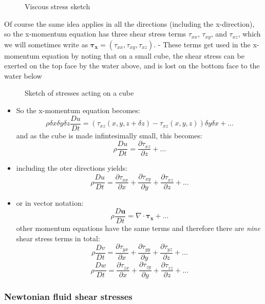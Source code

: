 \begin{figure}
\centering
\pandocbounded{}
\caption{Viscous stress sketch}
\end{figure}

Of course the same idea applies in all the directions (including the
x-direction), so the x-momentum equation has three shear stress terms
\(\tau_{xx}\), \(\tau_{xy}\), and \(\tau_{xz}\), which we will sometimes
write as \(\mathbf{\tau_x} = (\tau_{xx}, \tau_{xy}, \tau_{xz})\). -
These terms get used in the x-momentum equation by noting that on a
small cube, the shear stress can be exerted on the top face by the water
above, and is lost on the bottom face to the water below

\begin{figure}
\centering
\pandocbounded{}
\caption{Sketch of stresses acting on a cube}
\end{figure}

\begin{itemize}
\tightlist
\item
  So the x-momentum equation becomes:
  \[\rho \delta x \delta y \delta z \frac{D u}{Dt} = \left(\tau_{xz}(x,y,z+\delta z) - \tau_{xz}(x,y,z)\right) \delta y \delta x + ...\]
  and as the cube is made infintesimally small, this becomes:
  \[\rho \frac{D u}{Dt} = \frac{\partial \tau_{xz}}{\partial z} + ...\]
\item
  including the oter directions yields:
  \[\rho \frac{D u}{Dt} = \frac{\partial \tau_{xx}}{\partial x} + \frac{\partial \tau_{xy}}{\partial y} + \frac{\partial \tau_{xz}}{\partial z} +  ...\]
\item
  or in vector notation:
  \[\rho \frac{D \mathbf{u}}{Dt} = \nabla \cdot \mathbf{\tau_x} + ...\]
  other momentum equations have the same terms and therefore there are
  \emph{nine} shear stress terms in total:
  \[\rho \frac{D v}{Dt} = \frac{\partial \tau_{yx}}{\partial x} + \frac{\partial \tau_{yy}}{\partial y} + \frac{\partial \tau_{yz}}{\partial z} + ...\]
  \[\rho \frac{D w}{Dt} = \frac{\partial \tau_{zx}}{\partial x} + \frac{\partial \tau_{zy}}{\partial y} + \frac{\partial \tau_{zz}}{\partial z} + ...\]
\end{itemize}

\subsubsection{Newtonian fluid shear
stresses}\label{newtonian-fluid-shear-stresses}

